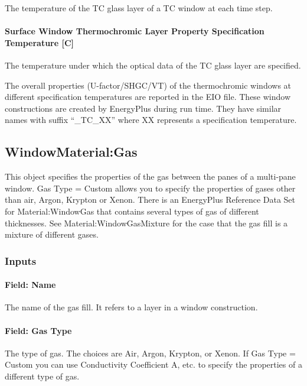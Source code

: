 The temperature of the TC glass layer of a TC window at each time step.

\paragraph{Surface Window Thermochromic Layer Property Specification Temperature {[}C{]}}\label{surface-window-thermochromic-layer-property-specification-temperature-c}

The temperature under which the optical data of the TC glass layer are specified.

The overall properties (U-factor/SHGC/VT) of the thermochromic windows at different specification temperatures are reported in the EIO file. These window constructions are created by EnergyPlus during run time. They have similar names with suffix ``\_TC\_XX'' where XX represents a specification temperature.

\subsection{WindowMaterial:Gas}\label{windowmaterialgas}

This object specifies the properties of the gas between the panes of a multi-pane window. Gas Type = Custom allows you to specify the properties of gases other than air, Argon, Krypton or Xenon. There is an EnergyPlus Reference Data Set for Material:WindowGas that contains several types of gas of different thicknesses. See Material:WindowGasMixture for the case that the gas fill is a mixture of different gases.

\subsubsection{Inputs}\label{inputs-16-011}

\paragraph{Field: Name}\label{field-name-10-016}

The name of the gas fill. It refers to a layer in a window construction.

\paragraph{Field: Gas Type}\label{field-gas-type}

The type of gas. The choices are Air, Argon, Krypton, or Xenon. If Gas Type = Custom you can use Conductivity Coefficient A, etc. to specify the properties of a different type of gas.

